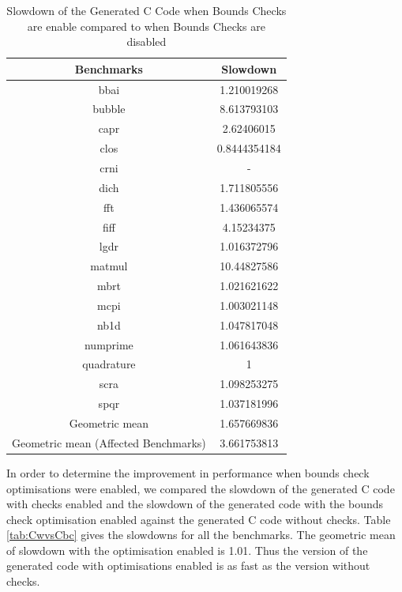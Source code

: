 \begin{table}[htbp]
\centering
\begin{tabular}{|c|c|}
\hline
Benchmarks                           & Slowdown     \\ \hline
bbai                                 & 1.210019268  \\ \hline
bubble                               & 8.613793103  \\ \hline
capr                                 & 2.62406015   \\ \hline
clos                                 & 0.8444354184 \\ \hline
crni                                 & -            \\ \hline
dich                                 & 1.711805556  \\ \hline
fft                                  & 1.436065574  \\ \hline
fiff                                 & 4.15234375   \\ \hline
lgdr                                 & 1.016372796  \\ \hline
matmul                               & 10.44827586  \\ \hline
mbrt                                 & 1.021621622  \\ \hline
mcpi                                 & 1.003021148  \\ \hline
nb1d                                 & 1.047817048  \\ \hline
numprime                             & 1.061643836  \\ \hline
quadrature                           & 1            \\ \hline
scra                                 & 1.098253275  \\ \hline
spqr                                 & 1.037181996  \\ \hline
Geometric mean                       & 1.657669836  \\ \hline
Geometric mean (Affected Benchmarks) & 3.661753813  \\ \hline
\end{tabular}
\caption{Slowdown of the Generated C Code when Bounds Checks are enable compared to when Bounds Checks are disabled}
\label{tab:CwovsCw}
\end{table}
In order to determine the improvement in performance when bounds check optimisations were enabled, we compared the slowdown of the generated C code with checks enabled  and the slowdown of the generated code with the bounds check optimisation enabled against the generated C code without checks. Table \ref{tab:CwvsCbc} gives the slowdowns for all the benchmarks. The geometric mean of slowdown with the optimisation enabled is 1.01. Thus the version of the generated code with optimisations enabled is as fast as the version without checks. 
